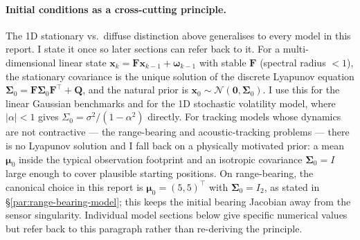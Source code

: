 \documentclass{article}
\begin{document}
\paragraph{Initial conditions as a cross-cutting principle.}
\label{par:init-conditions}
The 1D stationary vs.\ diffuse distinction above generalises to every model in this report. I state it once so later sections can refer back to it. For a multi-dimensional linear state $\mathbf{x}_k = \mathbf{F}\mathbf{x}_{k-1} + \boldsymbol{\omega}_{k-1}$ with stable $\mathbf{F}$ (spectral radius $<1$), the stationary covariance is the unique solution of the discrete Lyapunov equation $\boldsymbol{\Sigma}_0 = \mathbf{F}\boldsymbol{\Sigma}_0\mathbf{F}^\top + \mathbf{Q}$, and the natural prior is $\mathbf{x}_0 \sim \mathcal{N}(\mathbf{0}, \boldsymbol{\Sigma}_0)$. I use this for the linear Gaussian benchmarks and for the 1D stochastic volatility model, where $|\alpha| < 1$ gives $\Sigma_0 = \sigma^2/(1-\alpha^2)$ directly. For tracking models whose dynamics are not contractive --- the range-bearing and acoustic-tracking problems --- there is no Lyapunov solution and I fall back on a physically motivated prior: a mean $\boldsymbol{\mu}_0$ inside the typical observation footprint and an isotropic covariance $\boldsymbol{\Sigma}_0 = I$ large enough to cover plausible starting positions. On range-bearing, the canonical choice in this report is $\boldsymbol{\mu}_0 = (5, 5)^\top$ with $\boldsymbol{\Sigma}_0 = I_2$, as stated in \S\ref{par:range-bearing-model}; this keeps the initial bearing Jacobian away from the sensor singularity. Individual model sections below give specific numerical values but refer back to this paragraph rather than re-deriving the principle.
\end{document}
